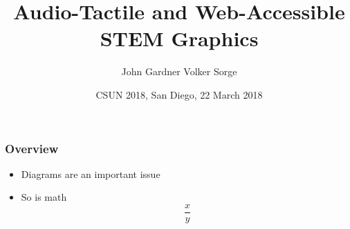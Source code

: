 \documentclass[xcolor=dvipsnames]{beamer}
\begin{document}
\title{Audio-Tactile and Web-Accessible STEM Graphics}
\author{John Gardner \qquad\qquad\qquad\qquad Volker Sorge}
\date{\small CSUN 2018, San Diego, 22 March 2018}


\begin{frame}
\titlepage
\end{frame}

\begin{frame}
\frametitle{Overview}
\begin{itemize}
\item Diagrams are an important issue
\item So is math $$\frac{x}{y}$$
\end{itemize}
\end{frame}
\end{document}

